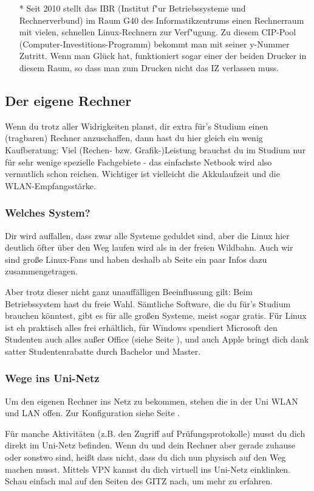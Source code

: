 \begin{multicols}{2}
\begin{itemize}
				\item[*] Seit 2010 stellt das IBR (Institut f"ur Betriebssysteme und Rechnerverbund) im Raum G40 des Informatikzentrums einen Rechnerraum mit vielen, schnellen Linux-Rechnern  zur Verf"ugung. Zu diesem CIP-Pool (Computer-Investitions-Programm) bekommt man mit seiner y-Nummer Zutritt. Wenn man Glück hat, funktioniert sogar einer der beiden Drucker in diesem Raum, so dass man zum Drucken nicht das IZ verlassen muss.
			\end{itemize}

		\subsection{Der eigene Rechner}
			Wenn du trotz aller Widrigkeiten planst, dir extra für's Studium einen (tragbaren) Rechner anzuschaffen, dann hast du hier gleich ein wenig  Kaufberatung: Viel (Rechen- bzw. Grafik-)Leistung brauchst du im Studium  nur für sehr wenige spezielle Fachgebiete - das einfachste Netbook wird also vermutlich schon reichen. Wichtiger ist vielleicht die Akkulaufzeit und die WLAN-Empfangsstärke.

		\subsubsection{Welches System?}
			Dir wird auffallen, dass zwar alle Systeme geduldet sind, aber die Linux hier deutlich öfter über den Weg laufen wird als in der freien Wildbahn. Auch wir sind große Linux-Fans und haben deshalb ab Seite \pageref{linux} ein paar Infos dazu zusammengetragen.

			Aber trotz dieser nicht ganz unauffälligen Beeinflussung gilt: Beim Betriebssystem hast du freie Wahl. Sämtliche Software, die du für's Studium brauchen  könntest, gibt es für alle großen Systeme, meist sogar gratis. Für Linux ist eh  praktisch alles frei erhältlich, für Windows spendiert Microsoft den Studenten auch alles außer Office (siehe Seite \pageref{msdnaa}), und auch Apple bringt dich dank satter Studentenrabatte durch Bachelor und Master. 

		\subsubsection{Wege ins Uni-Netz}
			Um den eigenen Rechner ins Netz zu bekommen, stehen die in der Uni WLAN und LAN offen. Zur Konfiguration siehe Seite \pageref{wlan}.

			Für manche Aktivitäten (z.B. den Zugriff auf Prüfungsprotokolle) musst du dich direkt im Uni-Netz befinden. Wenn du und dein Rechner aber gerade zuhause oder sonstwo sind, heißt dass nicht, dass du dich nun physisch auf den Weg machen musst. Mittels VPN kannst du dich virtuell ins Uni-Netz einklinken. Schau einfach mal auf den Seiten des GITZ nach, um mehr zu erfahren.
\end{multicols}